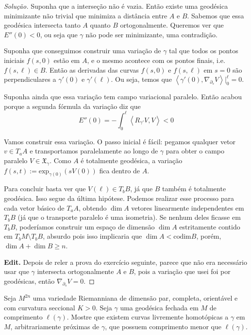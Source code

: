 \begin{proof}[Solução]
Suponha que a interseção não é vazia. Então existe uma geodésica minimizante não
trivial que minimiza a distância entre $A$ e $B$. Sabemos que essa geodésica
intersecta tanto $A$ quanto $B$ ortogonalmente. Queremos ver que $E''(0)<0$, ou
seja que $\gamma$ não pode ser minimizante, uma contradição.

Suponha que conseguimos construir uma variação de $\gamma$ tal que todos os
pontos iniciais $f(s,0)$ estão em $A$, e o mesmo acontece com os pontos finais,
i.e. $f(s,\ell) \in B$. Então as derivadas das curvas $f(s,0)$ e $f(s,\ell)$ em
$s=0$ são perpendiculares a  $\gamma'(0)$ e $\gamma'(\ell)$. Ou seja, temos que
$\left<\gamma'(0),\nabla_{\partial_s}V\right>|_{0}^\ell=0$.

Suponha ainda que essa variação tem campo variacional paralelo. Então acabou
porque a segunda fórmula da variação diz que \[E''(0)=-\int_0^\ell
\left<R_{\gamma'}V,V\right><0\]

Vamos construir essa variação. O passo inicial é fácil: pegamos qualquer vetor
$v \in T_a A$ e transportamos paralelamente ao longo de $\gamma$ para obter o
campo paralelo $V \in \mathfrak{X}_\gamma$. Como $A$ é totalmente geodésica, a
variação $f(s,t):=\text{exp}_{\gamma(0)}(sV(0))$ fica dentro de $A$.

Para concluir basta ver que $ V(\ell) \in T_bB$, já que $B$ também é totalmente
geodésica. Isso segue da última hipótese. Podemos realizar esse processo para
cada vetor básico de  $T_a A$, obtendo $\dim A$ vetores linearmente
independentes em $T_bB$ (já que o transporte paralelo é uma isometria). Se
nenhum deles ficasse em $T_bB$, poderíamos construir um espaço de dimensão $\dim
A$ estritamente contido em $T_b M\setminus T_b B$, absurdo pois isso implicaria
que $\dim A< \text{codim} B$, porém, $\dim A+ \dim B \geq n$.

\textbf{Edit.} Depois de reler a prova do exercício seguinte, parece que não era
necessário usar que $\gamma$ intersecta ortogonalmente $A$ e $B$, pois a
variação que usei foi por geodésicas, então $\nabla_{\partial_s}V=0$.
\end{proof}

\begin{exercise}
\label{exercise-free-homotopy-variation}
Seja $M^{2n}$ uma variedade Riemanniana de dimensão par, completa, orientável e
com curvatura seccional $K>0$. Seja $\gamma$ uma geodésica fechada em $M$ de
comprimento $\ell(\gamma)$. Mostre que existem curvas livremente homotópicas a
$\gamma$ em $M$, arbitrariamente próximas de $\gamma$, que possuem comprimento
menor que $\ell(\gamma)$.
\end{exercise}

